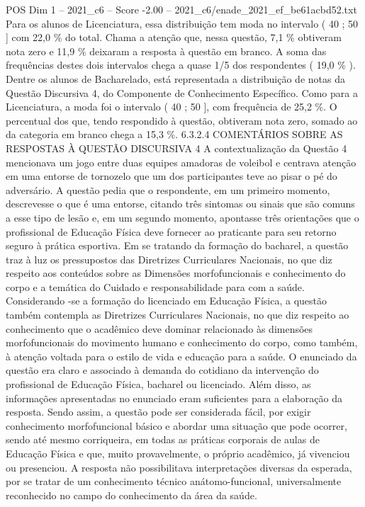 \begin{textsample}{POS Dim 1 – 2021\_c6 – Score -2.00 – 2021\_c6/enade\_2021\_ef\_be61acbd52.txt}
Para os alunos de Licenciatura, essa distribuição tem moda no intervalo ( 40 ; 50 ] com 22,0 \% do total.
Chama a atenção que, nessa questão, 7,1 \% obtiveram nota zero e 11,9 \% deixaram a resposta à questão em branco.
A soma das frequências destes dois intervalos chega a quase 1/5 dos respondentes ( 19,0 \% ).
Dentre os alunos de Bacharelado, está representada a distribuição de notas da Questão Discursiva 4, do Componente de Conhecimento Específico.
Como para a Licenciatura, a moda foi o intervalo ( 40 ; 50 ], com frequência de 25,2 \%.
O percentual dos que, tendo respondido à questão, obtiveram nota zero, somado ao da categoria em branco chega a 15,3 \%. 6.3.2.4 COMENTÁRIOS SOBRE AS RESPOSTAS À QUESTÃO DISCURSIVA 4 A contextualização da Questão 4 mencionava um jogo entre duas equipes amadoras de voleibol e centrava atenção em uma entorse de tornozelo que um dos participantes teve ao pisar o pé do adversário.
A questão pedia que o respondente, em um primeiro momento, descrevesse o que é uma entorse, citando três sintomas ou sinais que são comuns a esse tipo de lesão e, em um segundo momento, apontasse três orientações que o profissional de Educação Física deve fornecer ao praticante para seu retorno seguro à prática esportiva.
Em se tratando da formação do bacharel, a questão traz à luz os pressupostos das Diretrizes Curriculares Nacionais, no que diz respeito aos conteúdos sobre as Dimensões morfofuncionais e conhecimento do corpo e a temática do Cuidado e responsabilidade para com a saúde.
Considerando -se a formação do licenciado em Educação Física, a questão também contempla as Diretrizes Curriculares Nacionais, no que diz respeito ao conhecimento que o acadêmico deve dominar relacionado às dimensões morfofuncionais do movimento humano e conhecimento do corpo, como também, à atenção voltada para o estilo de vida e educação para a saúde.
O enunciado da questão era claro e associado à demanda do cotidiano da intervenção do profissional de Educação Física, bacharel ou licenciado.
Além disso, as informações apresentadas no enunciado eram suficientes para a elaboração da resposta.
Sendo assim, a questão pode ser considerada fácil, por exigir conhecimento morfofuncional básico e abordar uma situação que pode ocorrer, sendo até mesmo corriqueira, em todas as práticas corporais de aulas de Educação Física e que, muito provavelmente, o próprio acadêmico, já vivenciou ou presenciou.
A resposta não possibilitava interpretações diversas da esperada, por se tratar de um conhecimento técnico anátomo-funcional, universalmente reconhecido no campo do conhecimento da área da saúde.

\end{textsample}

